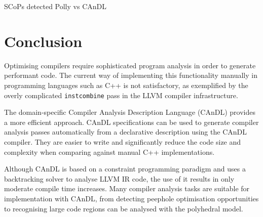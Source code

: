 \begin{table}[ht]
    
    \caption{SCoPs detected Polly vs CAnDL}
    \label{fig:candlvspolly}
\end{table}

\pagebreak

\section{Conclusion}

    Optimising compilers require sophisticated program analysis in order to
    generate performant code.
    The current way of implementing this functionality manually in programming
    languages such as C++ is not satisfactory, as exemplified by the overly
    complicated {\tt instcombine} pass in the LLVM compiler infrastructure.

    The domain-specific Compiler Analysis Description Language (CAnDL) provides
    a more efficient approach.
    CAnDL specifications can be used to generate compiler analysis passes
    automatically from a declarative description using the CAnDL compiler.
    They are easier to write and significantly reduce the code size and
    complexity when comparing against manual C++ implementations.

    Although CAnDL is based on a constraint programming paradigm and uses a
    backtracking solver to analyse LLVM IR code, the use of it results in
    only moderate compile time increases.
    Many compiler analysis tasks are suitable for implementation with CAnDL,
    from detecting peephole optimisation opportunities to recognising large
    code regions can be analysed with the polyhedral model.
